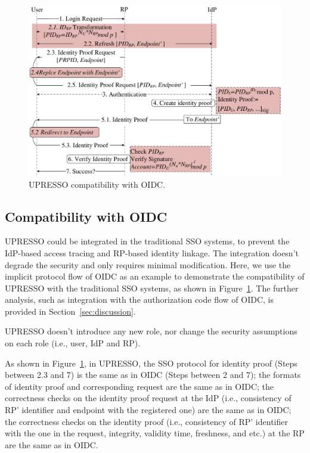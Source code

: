 \begin{figure}[t]
  \centering
  \includegraphics[width=\linewidth]{fig/overview1.pdf}
  \caption{UPRESSO compatibility with OIDC.}
  \label{fig:UPRESSO}
\end{figure}

\subsection{Compatibility with OIDC}
\label{subsec:compatible}
UPRESSO could be integrated in the traditional SSO systems, to  prevent the IdP-based access tracing and RP-based identity linkage.
The integration doesn't degrade the security and only requires minimal modification.
Here, we use the implicit protocol flow of OIDC as an example to demonstrate the compatibility of UPRESSO with the traditional SSO systems, as shown in Figure~\ref{fig:UPRESSO}.
The further analysis, such as integration with the authorization code flow of OIDC,  is provided in Section~\ref{sec:discussion}.

UPRESSO doesn't introduce any new role, nor change the security assumptions on each role (i.e., user, IdP and RP).

As shown in Figure~\ref{fig:UPRESSO}, in UPRESSO, the SSO protocol for identity proof  (Steps between 2.3 and 7) is the same as in OIDC (Steps between 2 and 7); the formats of identity proof and corresponding request are the same as in OIDC; the correctness checks on the identity proof request at the IdP (i.e., consistency of RP' identifier and endpoint with the registered one) are the same as in OIDC; the correctness checks on the identity proof (i.e., consistency of RP' identifier with the one in the request, integrity, validity time, freshness, and etc.) at the RP are the same as in OIDC.

